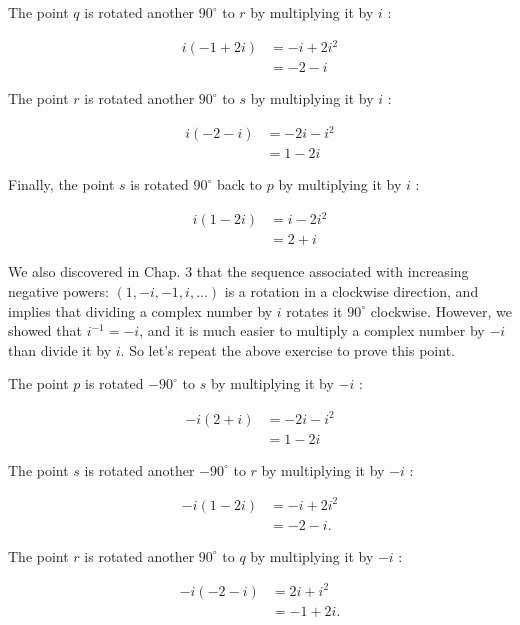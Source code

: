 The point $q$ is rotated another $90^{\circ}$ to $r$ by multiplying it by $i$ :

$$
    \begin{aligned}
        i(-1+2 i) & =-i+2 i^{2} \\
                  & =-2-i
    \end{aligned}
$$

The point $r$ is rotated another $90^{\circ}$ to $s$ by multiplying it by $i$ :

$$
    \begin{aligned}
        i(-2-i) & =-2 i-i^{2} \\
                & =1-2 i
    \end{aligned}
$$

Finally, the point $s$ is rotated $90^{\circ}$ back to $p$ by multiplying it by $i$ :

$$
    \begin{aligned}
        i(1-2 i) & =i-2 i^{2} \\
                 & =2+i
    \end{aligned}
$$

We also discovered in Chap. 3 that the sequence associated with increasing negative powers: $(1,-i,-1, i, \ldots)$ is a rotation in a clockwise direction, and implies that dividing a complex number by $i$ rotates it $90^{\circ}$ clockwise. However, we showed that $i^{-1}=-i$, and it is much easier to multiply a complex number by $-i$ than divide it by $i$. So let's repeat the above exercise to prove this point.

The point $p$ is rotated $-90^{\circ}$ to $s$ by multiplying it by $-i$ :

$$
    \begin{aligned}
        -i(2+i) & =-2 i-i^{2} \\
                & =1-2 i
    \end{aligned}
$$

The point $s$ is rotated another $-90^{\circ}$ to $r$ by multiplying it by $-i$ :

$$
    \begin{aligned}
        -i(1-2 i) & =-i+2 i^{2} \\
                  & =-2-i .
    \end{aligned}
$$

The point $r$ is rotated another $90^{\circ}$ to $q$ by multiplying it by $-i$ :

$$
    \begin{aligned}
        -i(-2-i) & =2 i+i^{2} \\
                 & =-1+2 i .
    \end{aligned}
$$


